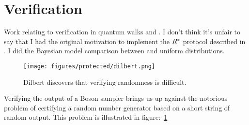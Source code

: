 \section{Verification}
\label{sec:Verification}
Work relating to verification in quantum walks and \bosonsampling{}. I don't
think it's unfair to say that I had the original motivation to implement the
\(R^{*}\) protocol described in \cite{notuniform}. I did the Bayesian model
comparison between \bosonsampling{} and uniform distributions.

\begin{figure}
  \centering
  \texttt{[image: figures/protected/dilbert.png]}
  \caption[Dilbert discovers that verifying randomness is difficult.]
  {Dilbert discovers that verifying randomness is difficult.}
  \label{fig:dilbert}
\end{figure}

Verifying the output of a Boson sampler brings us up against the notorious
problem of certifying a random number generator based on a short string of
random output. This problem is illustrated in figure:~\ref{fig:dilbert}
